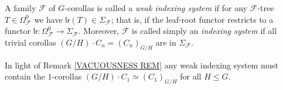 \documentclass[a4paper,10pt]{article}%
\begin{document}




\begin{definition}\label{INDEXSYS DEF}
	A family $\mathcal{F}$ of $G$-corollas is called a 
	\textit{weak indexing system}
	if for any $\mathcal{F}$-tree $T \in \Omega_{\mathcal{F}}^0$ we have 
	$\mathsf{lr}(T) \in \Sigma_{\mathcal{F}}$;
        that is, if the leaf-root functor restricts to a functor
	$\mathsf{lr} \colon \Omega_{\mathcal{F}}^0 \to \Sigma_{\mathcal{F}}$.
Moreover, $\mathcal{F}$ is called simply an \textit{indexing system} if all trivial corollas 
$(G/H)\cdot C_n = (C_n)_{G/H}$ are in $\Sigma_{\mathcal{F}}$.
\end{definition}


\begin{remark}
	In light of Remark \ref{VACUOUSNESS REM} any weak indexing system must contain the $1$-corollas $(G/H) \cdot C_1 \simeq (C_1)_{G/H}$ for all $H\leq G$.
\end{remark}
\end{document}
